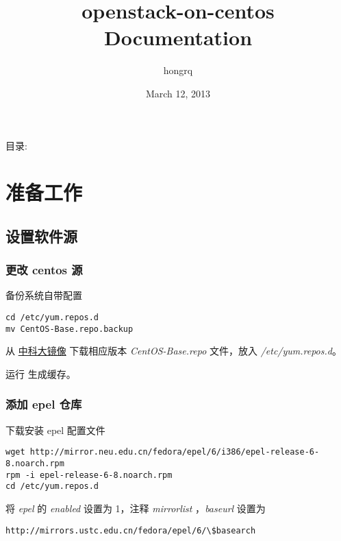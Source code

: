 \documentclass[a4paper,12pt,english]{sphinxmanual}
\title{openstack-on-centos Documentation}
\date{March 12, 2013}
\author{hongrq}
\begin{document}
\maketitle
\tableofcontents
{}\label{index::doc}


目录:


\chapter{准备工作}
\label{prepare:welcome-to-openstack-on-centos-s-documentation}\label{prepare::doc}\label{prepare:id1}

\section{设置软件源}
\label{prepare:id2}

\subsection{更改 centos 源}
\label{prepare:centos}
备份系统自带配置

\begin{Verbatim}[commandchars=\\\{\}]
cd /etc/yum.repos.d
mv CentOS-Base.repo.backup
\end{Verbatim}

从 \href{http://lug.ustc.edu.cn/wiki/mirrors/help/centos}{中科大镜像} 下载相应版本 \emph{CentOS-Base.repo} 文件，放入 \emph{/etc/yum.repos.d}。

运行  生成缓存。


\subsection{添加 epel 仓库}
\label{prepare:epel}
下载安装 epel 配置文件

\begin{Verbatim}[commandchars=\\\{\}]
wget http://mirror.neu.edu.cn/fedora/epel/6/i386/epel-release-6-8.noarch.rpm
rpm -i epel-release-6-8.noarch.rpm
cd /etc/yum.repos.d
\end{Verbatim}

将 \emph{epel} 的 \emph{enabled} 设置为 1，注释 \emph{mirrorlist} ，\emph{baseurl} 设置为

\begin{Verbatim}[commandchars=\\\{\}]
http://mirrors.ustc.edu.cn/fedora/epel/6/\$basearch
\end{Verbatim}
\end{document}
